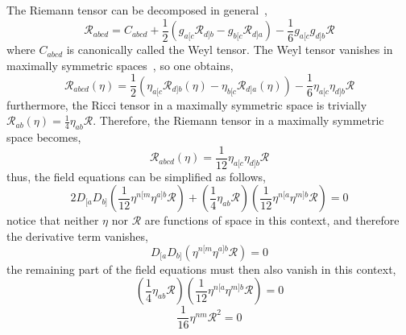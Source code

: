 \documentclass[aps,prd,preprint]{revtex4-1}
\begin{document}
The Riemann tensor can be decomposed in general~\cite{wheeler_2018},
\begin{equation}\label{Weyl_decomp}
    \mathcal{R}_{abcd} = C_{abcd} + \frac{1}{2} \left( g_{a[c} \mathcal{R}_{d]b} - g_{b[c} \mathcal{R}_{d]a} \right) - \frac{1}{6} g_{a[c} g_{d]b} \mathcal{R}
\end{equation}
where $C_{abcd}$ is canonically called the Weyl tensor. The Weyl tensor vanishes in maximally symmetric spaces~\cite{hofmann_2013}, so one obtains,
\begin{equation}
    \mathcal{R}_{abcd}(\eta) = \frac{1}{2} \left( \eta_{a[c} \mathcal{R}_{d]b}(\eta) - \eta_{b[c} \mathcal{R}_{d]a}(\eta) \right) - \frac{1}{6} \eta_{a[c} \eta_{d]b} \mathcal{R}
\end{equation}
furthermore, the Ricci tensor in a maximally symmetric space is trivially $\mathcal{R}_{ab}(\eta) = \frac{1}{4}\eta_{ab}\mathcal{R}$. Therefore, the Riemann tensor in a maximally symmetric space becomes,
\begin{equation}\label{maximally_symmetric_Riemann}
    \mathcal{R}_{abcd}(\eta) = \frac{1}{12} \eta_{a[c} \eta_{d]b} \mathcal{R}
\end{equation}
thus, the field equations can be simplified as follows,
\begin{equation}
    2 D_{[a} D_{b]} \left( \frac{1}{12} \eta^{n[m} \eta^{a]b} \mathcal{R} \right) + \left( \frac{1}{4}\eta_{ab}\mathcal{R} \right) \left( \frac{1}{12} \eta^{n[a} \eta^{m]b} \mathcal{R} \right) = 0
\end{equation}
notice that neither $\eta$ nor $\mathcal{R}$ are functions of space in this context, and therefore the derivative term vanishes,
\begin{equation*}
    D_{[a} D_{b]} \left( \eta^{n[m} \eta^{a]b} \mathcal{R} \right) = 0
\end{equation*}
the remaining part of the field equations must then also vanish in this context,
\begin{equation*}
    \left( \frac{1}{4}\eta_{ab}\mathcal{R} \right) \left( \frac{1}{12} \eta^{n[a} \eta^{m]b} \mathcal{R} \right) = 0
\end{equation*}
\begin{equation}
    \frac{1}{16} \eta^{nm} \mathcal{R}^2 = 0
\end{equation}
\end{document}
